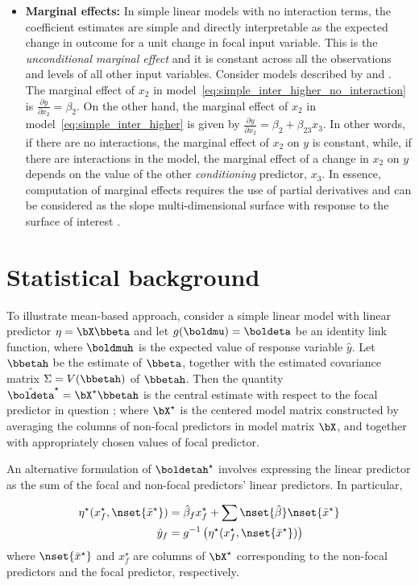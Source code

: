\begin{itemize}
\item \textbf{Marginal effects:} In simple linear models with no interaction terms, the coefficient estimates are simple and directly interpretable as the expected change in outcome for a unit change in focal input variable. This is the \emph{unconditional marginal effect} and it is constant across all the observations and levels of all other input variables. Consider models described by  and . The marginal effect of $x_2$ in model~\ref{eq:simple_inter_higher_no_interaction} is $\frac{\partial y}{\partial x_2} = \beta_2$. On the other hand, the marginal effect of $x_2$ in model~\ref{eq:simple_inter_higher} is given by $\frac{\partial y}{\partial x_2} = \beta_2 + \beta_{23}x_3$. In other words, if there are no interactions, the marginal effect of $x_2$ on $y$ is constant, while, if there are interactions in the model, the marginal effect of a change in $x_2$ on $y$ depends on the value of the other \emph{conditioning} predictor, $x_3$. In essence, computation of marginal effects requires the use of partial derivatives and can be considered as the slope multi-dimensional surface with response to the surface of interest \cite{leeper2017interpreting}. 
\end{itemize}

\section{Statistical background}

To illustrate mean-based approach, consider a simple linear model with linear predictor $\eta = \bX\bbeta$ and let $g(\boldmu) = \boldeta$ be an identity link function, where $\boldmuh$ is the expected value of response variable $\hat{y}$. Let $\bbetah$ be the estimate of $\bbeta$, together with the estimated covariance matrix $\Sigma = V(\bbetah)$ of $\bbetah$. Then the quantity $\hat{\boldeta}^\star = \bX^\star\bbetah$ is the central estimate with respect to the focal predictor in question \citep{fox2009effect}; where $\bX^\star$ is the centered model matrix constructed by averaging the columns of non-focal predictors in model matrix $\bX$, and together with appropriately chosen values of focal predictor.

An alternative formulation of $\boldetah^\star$ involves expressing the linear predictor as the sum of the focal and non-focal predictors' linear predictors. In particular, 

\begin{align}\label{eq:eta_mean}
\eta^\star(x^\star_f, \nset{{\bar{x}^\star}}) &= \hat{\beta}_f x^\star_f + \sum \nset{\hat{\beta}} \nset{{\bar{x}^\star}} \\
\hat{y}_f  &= g^{-1} \left(\eta^\star(x^\star_f, \nset{{\bar{x}^\star}})\right)
\end{align}
where $\nset{{\bar{x}^\star}}$ and $x^\star_f$ are columns of $\bX^\star$ corresponding to the non-focal predictors and the focal predictor, respectively.


